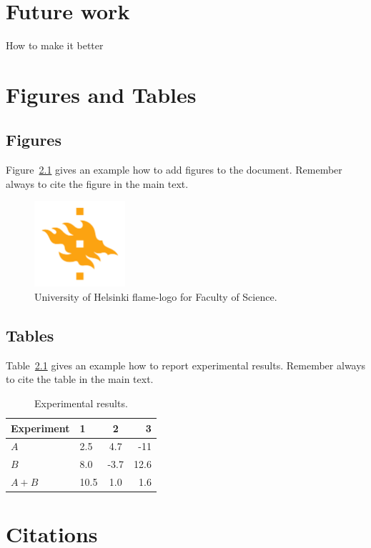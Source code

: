 \chapter{Future work}
How to make it better

\chapter{Figures and Tables}

\section{Figures}
Figure~\ref{fig:logo} gives an example how to add figures to the document. Remember always to cite the figure in the main text.

\begin{figure}[h!] 
\centering 
\includegraphics[width=0.3\textwidth]{HY-logo-ml.png}
\caption{University of Helsinki flame-logo for Faculty of Science.\label{fig:logo}}
\end{figure}

\section{Tables}

Table~\ref{table:results} gives an example how to report experimental results. Remember always to cite the table in the main text. 

\begin{table}
\centering
\caption{Experimental results.\label{table:results}}
\begin{tabular}{l||l c r} 
Experiment & 1 & 2 & 3 \\ 
\hline \hline 
$A$ & 2.5 & 4.7 & -11 \\
$B$ & 8.0 & -3.7 & 12.6 \\
$A+B$ & 10.5 & 1.0 & 1.6 \\
\hline
%
\end{tabular}
\end{table}

\chapter{Citations}

